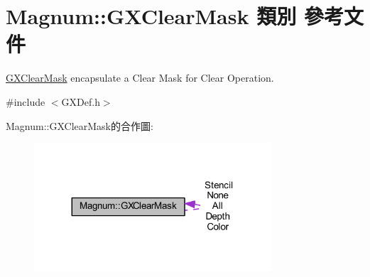 \hypertarget{class_magnum_1_1_g_x_clear_mask}{}\section{Magnum\+:\+:G\+X\+Clear\+Mask 類別 參考文件}
\label{class_magnum_1_1_g_x_clear_mask}


\hyperlink{class_magnum_1_1_g_x_clear_mask}{G\+X\+Clear\+Mask} encapsulate a Clear Mask for Clear Operation.  




{\ttfamily \#include $<$G\+X\+Def.\+h$>$}



Magnum\+:\+:G\+X\+Clear\+Mask的合作圖\+:\nopagebreak
\begin{figure}[H]
\begin{center}
\leavevmode
\includegraphics[width=251pt]{class_magnum_1_1_g_x_clear_mask__coll__graph}
\end{center}
\end{figure}
